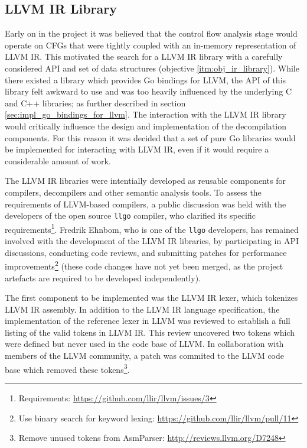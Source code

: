 
\subsection{LLVM IR Library}
\label{sec:impl_llvm_ir_library}

Early on in the project it was believed that the control flow analysis stage would operate on CFGs that were tightly coupled with an in-memory representation of LLVM IR. This motivated the search for a LLVM IR library with a carefully considered API and set of data structures (objective \ref{itm:obj_ir_library}). While there existed a library which provides Go bindings for LLVM, the API of this library felt awkward to use and was too heavily influenced by the underlying C and C++ libraries; as further described in section \ref{sec:impl_go_bindings_for_llvm}. The interaction with the LLVM IR library would critically influence the design and implementation of the decompilation components. For this reason it was decided that a set of pure Go libraries would be implemented for interacting with LLVM IR, even if it would require a considerable amount of work.

The LLVM IR libraries were intentially developed as reusable components for compilers, decompilers and other semantic analysis tools. To assess the requirements of LLVM-based compilers, a public discussion was held with the developers of the open source \texttt{llgo} compiler, who clarified its specific requirements\footnote{Requirements: \url{https://github.com/llir/llvm/issues/3}}. Fredrik Ehnbom, who is one of the \texttt{llgo} developers, has remained involved with the development of the LLVM IR libraries, by participating in API discussions, conducting code reviews, and submitting patches for performance improvements\footnote{Use binary search for keyword lexing: \url{https://github.com/llir/llvm/pull/11}} (these code changes have not yet been merged, as the project artefacts are required to be developed independently).

The first component to be implemented was the LLVM IR lexer, which tokenizes LLVM IR assembly. In addition to the LLVM IR language specification, the implementation of the reference lexer in LLVM was reviewed to establish a full listing of the valid tokens in LLVM IR. This review uncovered two tokens which were defined but never used in the code base of LLVM. In collaboration with members of the LLVM community, a patch was commited to the LLVM code base which removed these tokens\footnote{Remove unused tokens from AsmParser: \url{http://reviews.llvm.org/D7248}}.

